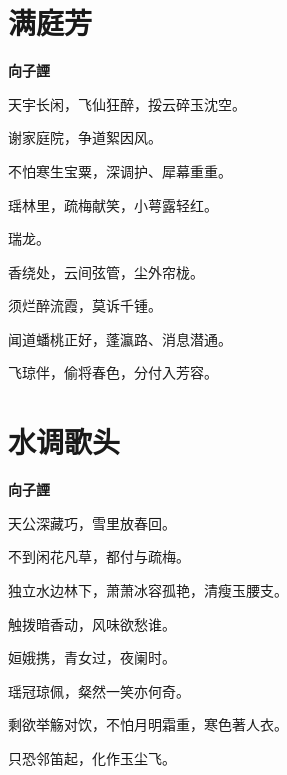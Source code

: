 \documentclass[12pt,a4paper]{ctexbook}
\begin{document}
\section{满庭芳}
\textbf{向子諲}\par\vspace{0.5em}
天宇长闲，飞仙狂醉，挼云碎玉沈空。\par
谢家庭院，争道絮因风。\par
不怕寒生宝粟，深调护、犀幕重重。\par
瑶林里，疏梅献笑，小萼露轻红。\par
瑞龙。\par
香绕处，云间弦管，尘外帘栊。\par
须烂醉流霞，莫诉千锺。\par
闻道蟠桃正好，蓬瀛路、消息潜通。\par
飞琼伴，偷将春色，分付入芳容。\par

\section{水调歌头}
\textbf{向子諲}\par\vspace{0.5em}
天公深藏巧，雪里放春回。\par
不到闲花凡草，都付与疏梅。\par
独立水边林下，萧萧冰容孤艳，清瘦玉腰支。\par
触拨暗香动，风味欲愁谁。\par
姮娥携，青女过，夜阑时。\par
瑶冠琼佩，粲然一笑亦何奇。\par
剩欲举觞对饮，不怕月明霜重，寒色著人衣。\par
只恐邻笛起，化作玉尘飞。\par
\end{document}
